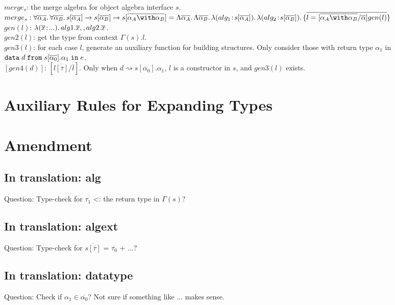 \documentclass[a4paper]{article}
\begin{document}
~\\

$merge_s$: the merge algebra for object algebra interface $s$.\\

$\mergealg$\\

$gen(l)$: $\lambda (\overline{x} \!:\! ...).\, alg1.\overline{x} ,, alg2.\overline{x}$.\\

$gen2(l)$: get the type from context $\Gamma(s).l$.\\

$gen3(l)$: for each case $l$, generate an auxiliary function for building structures. Only consider those with return type $\alpha_1$ in $\texttt{data} \; d \; \texttt{from} \; s {[} \overline{\alpha_0} {]} . \alpha_1 \; \texttt{in} \; e$.\\

$[gen4(d)]$: $[\overline{l[\overline{\tau}]}/\overline{l}]$. Only when $d \rightsquigarrow s[\overline{\alpha_0}].\alpha_1$, $l$ is a constructor in $s$, and $gen3(l)$ exists.

\section{Auxiliary Rules for Expanding Types}

\section{Amendment}

\subsection{In translation: alg}

Question: Type-check for $\tau_1$ <: the return type in $\Gamma(s)$?

\subsection{In translation: algext}

Question: Type-check for $\overline{s[\overline{\tau}]}$ = $\overline{\tau_0}$ + ...?

\subsection{In translation: datatype}

Question: Check if $\alpha_1\in\overline{\alpha_0}$? Not sure if something like ... makes sense.
\end{document}
